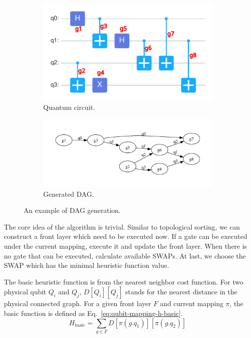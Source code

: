 \begin{figure}
	\centering
	\begin{subfigure}{0.49\textwidth}
		\centering
		\includegraphics[width=\textwidth]{8.2_figures/dag_circuit}
        \caption{Quantum circuit.}
	\end{subfigure}
	\begin{subfigure}{0.49\textwidth}
		\centering
		\includegraphics[width=\textwidth]{8.2_figures/dag_dag}
        \caption{Generated DAG.}
	\end{subfigure}
	\caption{An example of DAG generation.}
	\label{fig:qubit-mapping-dag}
\end{figure}

The core idea of the algorithm is trivial. Similar to topological sorting, we can construct a front layer which need to be executed now. If a gate can be executed under the current mapping, execute it and update the front layer. When there is no gate that can be executed, calculate available SWAPs. At last, we choose the SWAP which has the minimal heuristic function value.

The basic heuristic function is from the nearest neighbor cost function. For two physical qubit $Q_i$ and $Q_j$, $D[Q_i][Q_j]$ stands for the nearest distance in the physical connected graph. For a given front layer $F$ and current mapping $\pi$, the basic function is defined as 
Eq.~\eqref{eq:qubit-mapping-h-basic}.
\begin{equation} \label{eq:qubit-mapping-h-basic}
	H_{\text{basic}} = \sum_{g \in F} D[\pi (g.q_1)][\pi (g.q_2)]
\end{equation}


